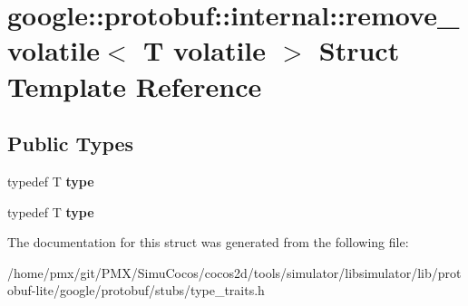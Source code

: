 \hypertarget{structgoogle_1_1protobuf_1_1internal_1_1remove__volatile_3_01T_01volatile_01_4}{}\section{google\+:\+:protobuf\+:\+:internal\+:\+:remove\+\_\+volatile$<$ T volatile $>$ Struct Template Reference}
\label{structgoogle_1_1protobuf_1_1internal_1_1remove__volatile_3_01T_01volatile_01_4}
\subsection*{Public Types}
\begin{DoxyCompactItemize}
\item 
\mbox{\label{structgoogle_1_1protobuf_1_1internal_1_1remove__volatile_3_01T_01volatile_01_4_a38f6fc47601790063ef8088c97d4b763}} 
typedef T {\bfseries type}
\item 
\mbox{\label{structgoogle_1_1protobuf_1_1internal_1_1remove__volatile_3_01T_01volatile_01_4_a38f6fc47601790063ef8088c97d4b763}} 
typedef T {\bfseries type}
\end{DoxyCompactItemize}


The documentation for this struct was generated from the following file\+:\begin{DoxyCompactItemize}
\item 
/home/pmx/git/\+P\+M\+X/\+Simu\+Cocos/cocos2d/tools/simulator/libsimulator/lib/protobuf-\/lite/google/protobuf/stubs/type\+\_\+traits.\+h\end{DoxyCompactItemize}
